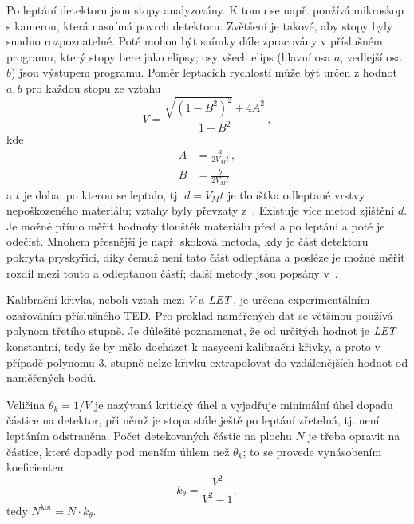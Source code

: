 Po leptání detektoru jsou stopy analyzovány. K tomu se např. používá mikroskop s kamerou, která nasnímá povrch detektoru. Zvětšení je takové, aby stopy byly snadno rozpoznatelné. Poté mohou být snímky dále zpracovány v příslušném programu, který stopy bere jako elipsy; osy všech elips (hlavní osa $a$, vedlejší osa $b$) jsou výstupem programu. 
Poměr leptacích rychlostí může být určen z hodnot $a,b$ pro každou stopu ze vztahu
\begin{equation}
  V=\frac{\sqrt{\left( 1-B^2 \right)^2}+4A^2}{1-B^2}\,,
  \label{eq:pomerLepRychlosti}
\end{equation}
kde
\begin{align*}
  A&=\frac{a}{2V_Mt}\,,\\
  B&=\frac{b}{2V_Mt}
\end{align*}
a $t$ je doba, po kterou se leptalo, tj. $d=V_Mt$ je tloušťka odleptané vrstvy nepoškozeného materiálu; vztahy byly převzaty z~\cite{ssntd}. Existuje více metod zjištění $d$. Je možné přímo měřit hodnoty tlouštěk materiálu před a po leptání a poté je odečíst. Mnohem přesnější je např. skoková metoda, kdy je část detektoru pokryta pryskyřicí, díky čemuž není tato část odleptána a posléze je možné měřit rozdíl mezi touto a odleptanou částí; další metody jsou popsány v~\cite{thesisKPBrabcova}.    

Kalibrační křivka, neboli vztah mezi $V$ a $\mathit{LET}$, je určena experimentálním ozařováním příslušného TED. Pro proklad naměřených dat se většinou používá polynom třetího stupně. Je důležité poznamenat, že od určitých hodnot je $\mathit{LET}$ konstantní, tedy že by mělo docházet k nasycení kalibrační křivky, a proto v případě polynomu 3. stupně nelze křivku extrapolovat do vzdálenějších hodnot od naměřených bodů. 

Veličina $\theta_k=1/V$ je nazývaná kritický úhel a vyjadřuje minimální úhel dopadu částice na detektor, při němž je stopa stále ještě po leptání zřetelná, tj. není leptáním odstraněna. Počet detekovaných částic na plochu $N$ je třeba opravit na částice, které dopadly pod menším úhlem než  $\theta_k$; to se provede vynásobením koeficientem 
\begin{equation}
  k_{\theta}=\frac{V^2}{V^2-1},
  \label{eq:kritickyUhel}
\end{equation}
tedy $N^{\text{kor}}=N\cdot k_{\theta}$. 

